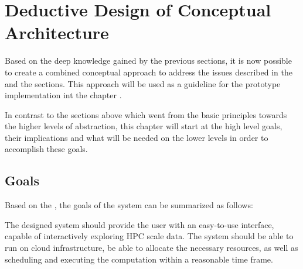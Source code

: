 \section{Deductive Design of Conceptual Architecture}

Based on the deep knowledge gained by the previous sections,
it is now possible to create a combined conceptual approach to address the issues
described in the  and the  sections.
This approach will be used as a guideline for the prototype implementation int the chapter .

In contrast to the sections above which went from the basic principles towards the higher levels of abstraction,
this chapter will start at the high level goals, their implications and what will be needed on the lower levels
in order to accomplish these goals.

\subsection{Goals}
\label{sec:goals}

Based on the , the goals of the system can be summarized as follows:



The designed system should provide the user with an easy-to-use interface,
capable of interactively exploring \ac{HPC} scale data.
The system should be able to run on cloud infrastructure, be able
to allocate the necessary resources, as well as scheduling and executing
the computation within a reasonable time frame.

